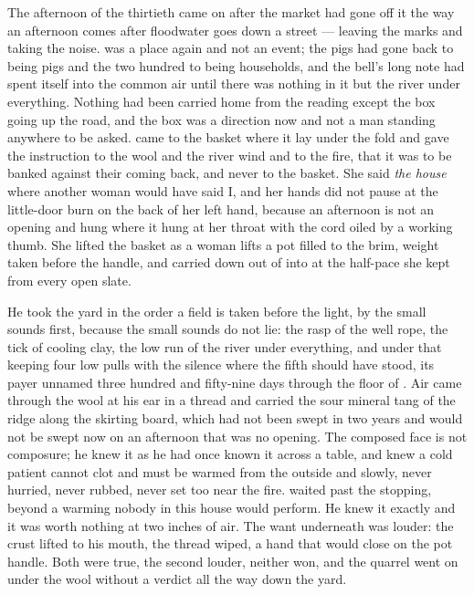 The afternoon of the thirtieth came on after the market had gone off it the way an afternoon comes after floodwater goes down a street --- leaving the marks and taking the noise.  was a place again and not an event; the pigs had gone back to being pigs and the two hundred to being households, and the bell's long note had spent itself into the common air until there was nothing in it but the river under everything. Nothing had been carried home from the reading except the box going up the road, and the box was a direction now and not a man standing anywhere to be asked.  came to the basket where it lay under the fold and gave the instruction to the wool and the river wind and to the fire, that it was to be banked against their coming back, and never to the basket. She said \emph{the house} where another woman would have said I, and her hands did not pause at the little-door burn on the back of her left hand, because an afternoon is not an opening and  hung where it hung at her throat with the cord oiled by a working thumb. She lifted the basket as a woman lifts a pot filled to the brim, weight taken before the handle, and carried  down out of  into  at the half-pace she kept from every open slate.

He took the yard in the order a field is taken before the light, by the small sounds first, because the small sounds do not lie: the rasp of the well rope, the tick of cooling clay, the low run of the river under everything, and under that  keeping four low pulls with the silence where the fifth should have stood, its payer unnamed three hundred and fifty-nine days through the floor of . Air came through the wool at his ear in a thread and carried the sour mineral tang of the ridge along the skirting board, which had not been swept in two years and would not be swept now on an afternoon that was no opening. The composed face is not composure; he knew it as he had once known it across a table, and knew a cold patient cannot clot and must be warmed from the outside and slowly, never hurried, never rubbed, never set too near the fire.  waited past the stopping, beyond a warming nobody in this house would perform. He knew it exactly and it was worth nothing at two inches of air. The want underneath was louder: the crust lifted to his mouth, the thread wiped, a hand that would close on the pot handle. Both were true, the second louder, neither won, and the quarrel went on under the wool without a verdict all the way down the yard.

